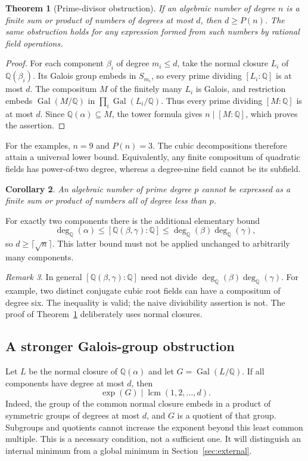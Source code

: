 \documentclass[11pt,a4paper]{article}
\newcommand{\Q}{\mathbb Q}
\newcommand{\degQ}{\operatorname{deg}_{\Q}}
\newcommand{\Gal}{\operatorname{Gal}}
\newtheorem{theorem}{Theorem}[section]
\newtheorem{corollary}[theorem]{Corollary}
\theoremstyle{remark}\newtheorem{remark}[theorem]{Remark}
\begin{document}
\begin{theorem}[Prime-divisor obstruction]
\label{thm:prime}
If an algebraic number of degree $n$ is a finite sum or product of numbers of degrees at most $d$, then $d\ge P(n)$. The same obstruction holds for any expression formed from such numbers by rational field operations.
\end{theorem}
\begin{proof}
For each component $\beta_i$ of degree $m_i\le d$, take the normal closure $L_i$ of $\Q(\beta_i)$. Its Galois group embeds in $S_{m_i}$, so every prime dividing $[L_i:\Q]$ is at most $d$. The compositum $M$ of the finitely many $L_i$ is Galois, and restriction embeds $\Gal(M/\Q)$ in $\prod_i\Gal(L_i/\Q)$. Thus every prime dividing $[M:\Q]$ is at most $d$. Since $\Q(\alpha)\subseteq M$, the tower formula gives $n\mid[M:\Q]$, which proves the assertion.
\end{proof}

For the examples, $n=9$ and $P(n)=3$. The cubic decompositions therefore attain a universal lower bound. Equivalently, any finite compositum of quadratic fields has power-of-two degree, whereas a degree-nine field cannot be its subfield.

\begin{corollary}
An algebraic number of prime degree $p$ cannot be expressed as a finite sum or product of numbers all of degree less than $p$.
\end{corollary}

For exactly two components there is the additional elementary bound
\[
 \degQ(\alpha)\le[\Q(\beta,\gamma):\Q]
 \le\degQ(\beta)\degQ(\gamma),
\]
so $d\ge\lceil\sqrt n\rceil$. This latter bound must not be applied unchanged to arbitrarily many components.

\begin{remark}
In general $[\Q(\beta,\gamma):\Q]$ need not divide $\degQ(\beta)\degQ(\gamma)$. For example, two distinct conjugate cubic root fields can have a compositum of degree six. The inequality is valid; the naive divisibility assertion is not. The proof of Theorem~\ref{thm:prime} deliberately uses normal closures.
\end{remark}

\subsection{A stronger Galois-group obstruction}
Let $L$ be the normal closure of $\Q(\alpha)$ and let $G=\Gal(L/\Q)$. If all components have degree at most $d$, then
\begin{equation}
 \exp(G)\mid\operatorname{lcm}(1,2,\ldots,d).
 \label{eq:exponent}
\end{equation}
Indeed, the group of the common normal closure embeds in a product of symmetric groups of degrees at most $d$, and $G$ is a quotient of that group. Subgroups and quotients cannot increase the exponent beyond this least common multiple. This is a necessary condition, not a sufficient one. It will distinguish an internal minimum from a global minimum in Section~\ref{sec:external}.
\end{document}
